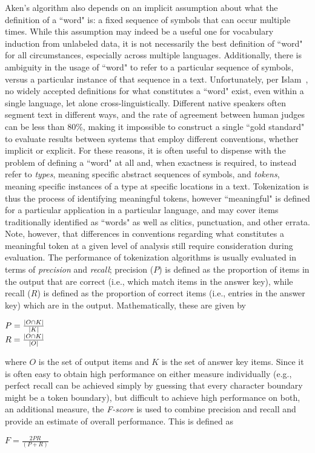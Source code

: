 Aken's algorithm also depends on an implicit assumption about what the definition of a ``word" is: a fixed sequence of symbols that can occur multiple times. While this assumption may indeed be a useful one for vocabulary induction from unlabeled data, it is not necessarily the best definition of ``word" for all circumstances, especially across multiple languages. Additionally, there is ambiguity in the usage of ``word" to refer to a particular sequence of symbols, versus a particular instance of that sequence in a text. Unfortunately, per Islam~\cite{islam07}, no widely accepted definitions for what constitutes a ``word" exist, even within a single language, let alone cross-linguistically. Different native speakers often segment text in different ways, and the rate of agreement between human judges can be less than 80\%, making it impossible to construct a single ``gold standard" to evaluate results between systems that employ different conventions, whether implicit or explicit. For these reasons, it is often useful to dispense with the problem of defining a ``word" at all and, when exactness is required, to instead refer to \textit{types}, meaning specific abstract sequences of symbols, and \textit{tokens}, meaning specific instances of a type at specific locations in a text. Tokenization is thus the process of identifying meaningful tokens, however ``meaningful" is defined for a particular application in a particular language, and may cover items traditionally identified as ``words" as well as clitics, punctuation, and other errata. Note, however, that differences in conventions regarding what constitutes a meaningful token at a given level of analysis still require consideration during evaluation. The performance of tokenization algorithms is usually evaluated in terms of \textit{precision} and \textit{recall}; precision ($P$) is defined as the proportion of items in the output that are correct (i.e., which match items in the answer key), while recall ($R$) is defined as the proportion of correct items (i.e., entries in the answer key) which are in the output. Mathematically, these are given by
\begin{center}
	$P = \frac{\left|O \cap K\right|}{\left|K\right|}$ \\
	$R = \frac{\left|O \cap K\right|}{\left|O\right|}$
\end{center}
where $O$ is the set of output items and $K$ is the set of answer key items. Since it is often easy to obtain high performance on either measure individually (e.g., perfect recall can be achieved simply by guessing that every character boundary might be a token boundary), but difficult to achieve high performance on both, an additional measure, the \textit{F-score} is used to combine precision and recall and provide an estimate of overall performance. This is defined as
\begin{center}
	$F = \frac{2PR}{(P + R)}$
\end{center}

